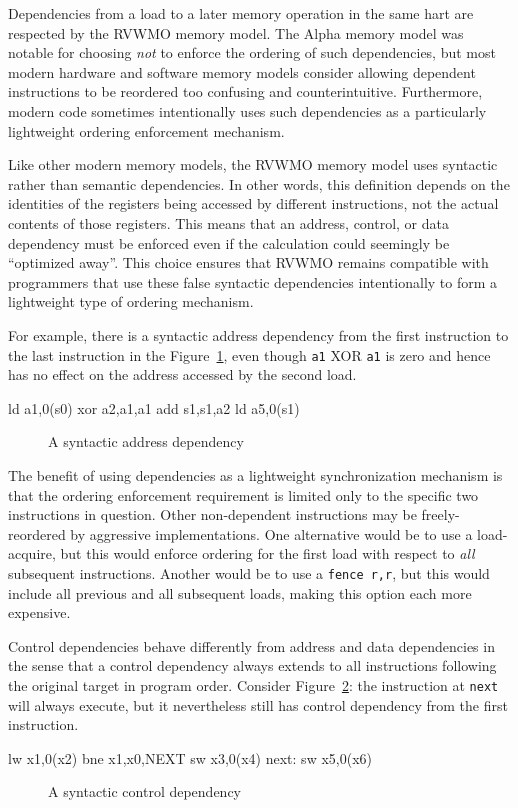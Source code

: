 Dependencies from a load to a later memory operation in the same hart are respected by the RVWMO memory model.
The Alpha memory model was notable for choosing {\em not} to enforce the ordering of such dependencies, but most modern hardware and software memory models consider allowing dependent instructions to be reordered too confusing and counterintuitive.
Furthermore, modern code sometimes intentionally uses such dependencies as a particularly lightweight ordering enforcement mechanism.

Like other modern memory models, the RVWMO memory model uses syntactic rather than semantic dependencies.
In other words, this definition depends on the identities of the
registers being accessed by different instructions, not the actual
contents of those registers.  This means that an address, control, or
data dependency must be enforced even if the calculation could seemingly
be ``optimized away''.
This choice ensures that RVWMO remains compatible with programmers that use these false syntactic dependencies intentionally to form a lightweight type of ordering mechanism.

For example, there is a syntactic address
dependency from the first instruction to the last instruction in the
Figure~\ref{fig:litmus:address}, even though {\tt a1} XOR {\tt a1} is zero and
hence has no effect on the address accessed by the second load.
\begin{verbbox}
ld  a1,0(s0)
xor a2,a1,a1
add s1,s1,a2
ld  a5,0(s1)
\end{verbbox}
\begin{figure}[h!]
  \centering\small
  \theverbbox
  \caption{A syntactic address dependency}
  \label{fig:litmus:address}
\end{figure}

The benefit of using dependencies as a lightweight synchronization mechanism is that the ordering enforcement requirement is limited only to the specific two instructions in question.
Other non-dependent instructions may be freely-reordered by aggressive implementations.
One alternative would be to use a load-acquire, but this would enforce ordering for the first load with respect to {\em all} subsequent instructions.
Another would be to use a {\tt fence r,r}, but this would include all previous and all subsequent loads, making this option each more expensive.

Control dependencies behave differently from address and data dependencies in the sense that a control dependency always extends to all instructions following the original target in program order.
Consider Figure~\ref{fig:litmus:control1}: the instruction at {\tt next} will always execute, but it nevertheless still has control dependency from the first instruction.
\begin{verbbox}
      lw  x1,0(x2)
      bne x1,x0,NEXT
      sw  x3,0(x4)
next: sw  x5,0(x6)
\end{verbbox}
\begin{figure}[h!]
  \centering\small
  \theverbbox
  \caption{A syntactic control dependency}
  \label{fig:litmus:control1}
\end{figure}

